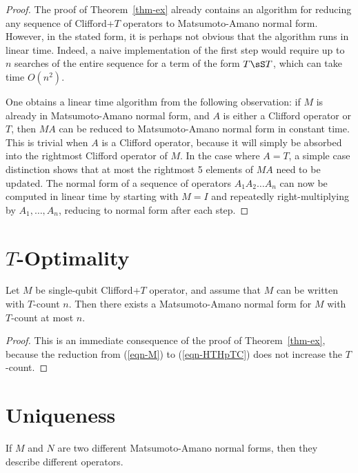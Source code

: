 \documentclass{article}
\begin{document}
\begin{proof}
  The proof of Theorem~\ref{thm-ex} already contains an algorithm
  for reducing any sequence of Clifford+$T$ operators to
  Matsumoto-Amano normal form. However, in the stated form, it is
  perhaps not obvious that the algorithm runs in linear time. Indeed,
  a naive implementation of the first step would require up to $n$
  searches of the entire sequence for a term of the form $T\sS T$,
  which can take time $O(n^2)$.

  One obtains a linear time algorithm from the following observation:
  if $M$ is already in Matsumoto-Amano normal form, and $A$ is either
  a Clifford operator or $T$, then $MA$ can be reduced to
  Matsumoto-Amano normal form in constant time. This is trivial when
  $A$ is a Clifford operator, because it will simply be absorbed into
  the rightmost Clifford operator of $M$. In the case where $A=T$, a
  simple case distinction shows that at most the rightmost 5 elements
  of $MA$ need to be updated. The normal form of a sequence of
  operators $A_1A_2\ldots A_n$ can now be computed in linear time by
  starting with $M=I$ and repeatedly right-multiplying by
  $A_1,\ldots,A_n$, reducing to normal form after each step.
\end{proof}

\section{$T$-Optimality}

\begin{corollary}
  Let $M$ be single-qubit Clifford+$T$ operator, and assume that $M$
  can be written with $T$-count $n$. Then there exists a
  Matsumoto-Amano normal form for $M$ with $T$-count at most $n$.
\end{corollary}

\begin{proof}
  This is an immediate consequence of the proof of
  Theorem~\ref{thm-ex}, because the reduction from (\ref{eqn-M})
  to (\ref{eqn-HTHpTC}) does not increase the $T$-count.
\end{proof}

\section{Uniqueness}

\begin{theorem}\label{thm-ma}
  If $M$ and $N$ are two different Matsumoto-Amano normal forms, then
  they describe different operators.
\end{theorem}
\end{document}
